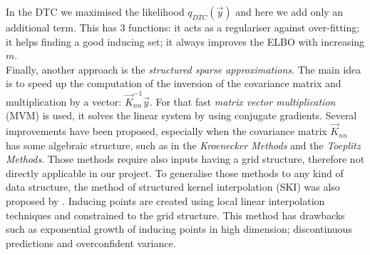 In the DTC we maximised the likelihood $q_{DTC}(\vec{y})$ and here we add only an additional term. This has 3 functions: it acts as a regulariser against over-fitting; it helps finding a good inducing set; it always improves the ELBO with increasing $m$.  \\

Finally, another approach is the \textit{structured sparse approximations}. The main idea is to speed up the computation of the inversion of the covariance matrix and multiplication by a vector: $\vec{K}_{nn}^{-1}\vec{y}$. For that fast \textit{matrix vector multiplication} (MVM) is used, it solves the linear system by using conjugate gradients. Several improvements have been proposed, especially when the covariance matrix $\vec{K}_{nn}$ has some algebraic structure, such as in the \textit{Kroenecker Methods} and the \textit{Toeplitz Methods}. Those methods require also inputs having a grid structure, therefore not directly applicable in our project.  To generalise those methods to any kind of data structure, the method of structured kernel interpolation (SKI) was also proposed by \citet{wilson_kernel_2015}. Inducing points are created using local linear interpolation techniques and constrained to the grid structure. This method has drawbacks such as exponential growth of inducing points in high dimension; discontinuous predictions and overconfident variance. 


